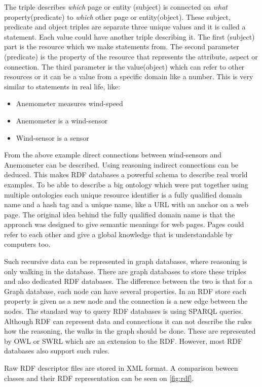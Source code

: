 The triple describes \textit{which} page or entity (subject) is connected on \textit{what} property(predicate) to \textit{which} other page or entity(object). These subject, predicate and object triples are separate three unique values and it is called a statement.
Each value could have another triple describing it. The first (subject) part is the resource  which we make statements from. The second parameter (predicate) is the property of the resource that represents the attribute, aspect or connection. The third parameter is the value(object) which can refer to other resources or it can be a value from a specific domain like a number. This is very similar to statements in real life, like:
\begin{itemize}
\item Anemometer measures wind-speed
\item Anemometer is a wind-sensor
\item Wind-sensor is a sensor
\end{itemize} 
From the above example direct connections between wind-sensors and Anemometer can be described. Using reasoning indirect connections can be deduced. This makes RDF databases a powerful schema to describe real world examples. To be able to describe a big ontology which were put together using multiple ontologies each unique resource identifier is a fully qualified domain name and a hash tag and a unique name, like a URL with an anchor on a web page. 
The original idea behind the fully qualified domain name is that the approach was designed to give semantic meanings for web pages. 
Pages could refer to each other and give a global knowledge that is understandable by computers too. 

Such recursive data can be represented in graph databases, where reasoning is only walking in the database. There are graph databases to store these triples and also dedicated RDF databases. The difference between the two is that for a Graph database, each node can have several properties. In an RDF store each property is given as a new node and the connection is a new edge between the nodes. The standard way to query RDF databases is using SPARQL queries. Although RDF can represent data and connections it can not describe the rules how the reasoning, the walks in the graph should be done. These are represented by OWL or SWRL which are an extension to the RDF. However, most RDF databases also support such rules.

Raw RDF descriptor files are stored in XML format. A comparison beween classes and their RDF representation can be seen on \ref{fig:rdf}.


